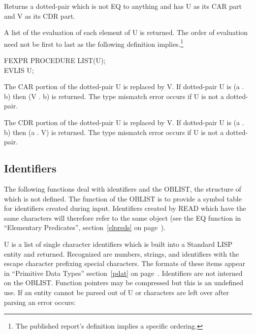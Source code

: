 \documentclass[11pt,letterpaper]{book}
\begin{document}
{Returns a dotted-pair which is not EQ to anything and has U as its
 
CAR part and V as its CDR part.}


{A list of the evaluation of each element of U is returned. The order
of evaluation need not be first to last as the following definition
implies.\footnote{The published report's definition implies a specific
ordering.}

{\tt \begin{tabbing} FEXPR PROCEDURE LIST(U); \\
\hspace*{1em} EVLIS U;
\end{tabbing}}}


{The CAR portion of the dotted-pair U is replaced by V. If dotted-pair
U is (a . b) then (V . b) is returned. The type mismatch error occurs
if U is not a dotted-pair. }


{The CDR portion of the dotted-pair U is replaced by V. If dotted-pair
U is (a . b) then (a . V) is returned. The type mismatch error occurs
if U is not a dotted-pair.}


\subsection{Identifiers}
\label{identifiers}
The following functions deal with identifiers and the OBLIST,
the structure of which is not defined. The function of the OBLIST is
to provide a symbol table for identifiers created during input.
Identifiers created by READ which have the same characters will
 
therefore refer to the same object (see the EQ function in
``Elementary Predicates'', section~\ref{elpreds} on
page~\pageref{elpreds}).



{U is a list of single character identifiers which is built into a
Standard LISP entity and returned. Recognized are numbers, strings,
and identifiers with the escape character prefixing special
characters. The formats of these items appear in ``Primitive Data
Types'' section~\ref{pdat} on page~\pageref{pdat}. Identifiers are not
interned on the OBLIST. Function pointers may be compressed but this
is an undefined use. If an entity cannot be parsed out of U or
characters are left over after parsing an error occurs:

}
\end{document}
